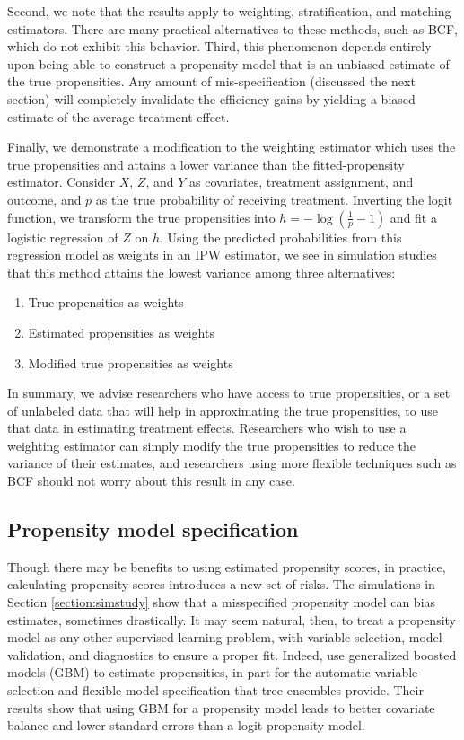 \documentclass[aos]{imsart}
\begin{document}
Second, we note that the results apply to weighting, stratification, and matching estimators. There are many practical alternatives to these methods, such as 
BCF, which do not exhibit this behavior. Third, this phenomenon depends entirely upon being able to construct a propensity model that is an unbiased estimate of the true 
propensities. Any amount of mis-specification (discussed the next section) will completely invalidate the efficiency gains by yielding a biased estimate of the average 
treatment effect.

Finally, we demonstrate a modification to the weighting estimator which uses the true propensities and attains a lower variance than the fitted-propensity estimator.
Consider $X$, $Z$, and $Y$ as covariates, treatment assignment, and outcome, and $p$ as the true probability of receiving treatment. Inverting the logit function, we transform the true 
propensities into $h = - \log(\frac{1}{p} - 1)$ and fit a logistic regression of $Z$ on $h$. Using the predicted probabilities from this regression model as weights in an IPW estimator, 
we see in simulation studies that this method attains the lowest variance among three alternatives:
\begin{enumerate}
\item True propensities as weights
\item Estimated propensities as weights
\item Modified true propensities as weights
\end{enumerate} 

In summary, we advise researchers who have access to true propensities, or a set of unlabeled data that will help in approximating the true propensities, to use that data in 
estimating treatment effects. Researchers who wish to use a weighting estimator can simply modify the true propensities to reduce the variance of their estimates, and researchers 
using more flexible techniques such as BCF should not worry about this result in any case.

\subsection{Propensity model specification}
\label{subsection:overfitprop}

Though there may be benefits to using estimated propensity scores, in practice, calculating propensity scores introduces a new set of risks. The simulations in Section \ref{section:simstudy} 
show that a misspecified propensity model can bias estimates, sometimes drastically. It may seem natural, then, to treat a propensity model as any other supervised learning 
problem, with variable selection, model validation, and diagnostics to ensure a proper fit. 
Indeed, \cite{mccaffrey2004propensity} use generalized boosted models (GBM) to estimate propensities, in part for the automatic variable selection and flexible model specification that 
tree ensembles provide. Their results show that using GBM for a propensity model leads to better covariate balance and lower standard errors than a logit propensity model.
\end{document}
